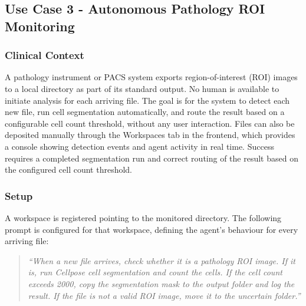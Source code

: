 \documentclass[conference]{IEEEtran}
\begin{document}
\subsection{Use Case 3 - Autonomous Pathology ROI Monitoring}

\subsubsection{Clinical Context}
A pathology instrument or PACS system exports region-of-interest (ROI) images to a local directory as part of its standard output. No human is available to initiate analysis for each arriving file. The goal is for the system to detect each new file, run cell segmentation automatically, and route the result based on a configurable cell count threshold, without any user interaction. Files can also be deposited manually through the Workspaces tab in the frontend, which provides a console showing detection events and agent activity in real time. Success requires a completed segmentation run and correct routing of the result based on the configured cell count threshold.

\subsubsection{Setup}
A workspace is registered pointing to the monitored directory. The following prompt is configured for that workspace, defining the agent's behaviour for every arriving file:

\begin{quote}
\textit{``When a new file arrives, check whether it is a pathology ROI image. If it is, run Cellpose cell segmentation and count the cells. If the cell count exceeds 2000, copy the segmentation mask to the output folder and log the result. If the file is not a valid ROI image, move it to the uncertain folder.''}
\end{quote}
\end{document}
